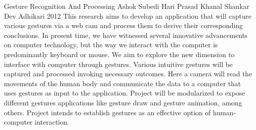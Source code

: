  \begin{conf-abstract}[]
 {Gesture Recognition And Processing}
{
	Ashok Subedi
	Hari Prasad Khanal
	Shankar Dev Adhikari
}
{2012}
This research aims to develop an application that will capture various
gestures via a web cam and process them to derive their corresponding
conclusions. In present time, we have witnessed several innovative
advancements on computer technology, but the way we interact with the
computer is predominantly keyboard or mouse. We aim to explore the
new dimension to interface with computer through gestures. Various
intuitive gestures will be captured and processed invoking necessary
outcomes. Here a camera will read the movements of the human body
and communicate the data to a computer that uses gestures as input to
the application. Project will be modularized to expose different gestures
applications like gesture draw and gesture animation, among others.
Project intends to establish gestures as an effective option of human-
computer interaction.
  \end{conf-abstract}